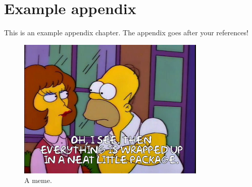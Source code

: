 \chapter{Example appendix}
\label{appen:exampleappendix}
This is an example appendix chapter. The appendix goes after your references!

\vspace{2.75cm}
\begin{figure}[H]
\begin{center}
	\includegraphics[width = 9cm]{neat_little_package.jpg}
\end{center}
\caption{A meme.}
\end{figure}